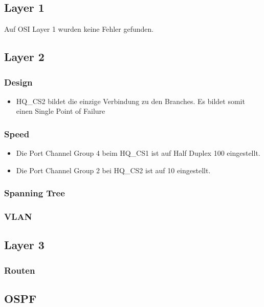 \subsection{Layer 1}
Auf OSI Layer 1 wurden keine Fehler gefunden.

\subsection{Layer 2}

\subsubsection{Design}
\begin{itemize}
	\item HQ\_CS2 bildet die einzige Verbindung zu den Branches. Es bildet somit einen Single Point of Failure
\end{itemize}

\subsubsection{Speed}
\begin{itemize}
	\item Die Port Channel Group 4 beim HQ\_CS1 ist auf Half Duplex 100 eingestellt.
	\item Die Port Channel Group 2 bei HQ\_CS2 ist auf 10 eingestellt. 
\end{itemize}

\subsubsection{Spanning Tree}

\subsubsection{VLAN}

\subsection{Layer 3}

\subsubsection{Routen}

\subsection{OSPF}



